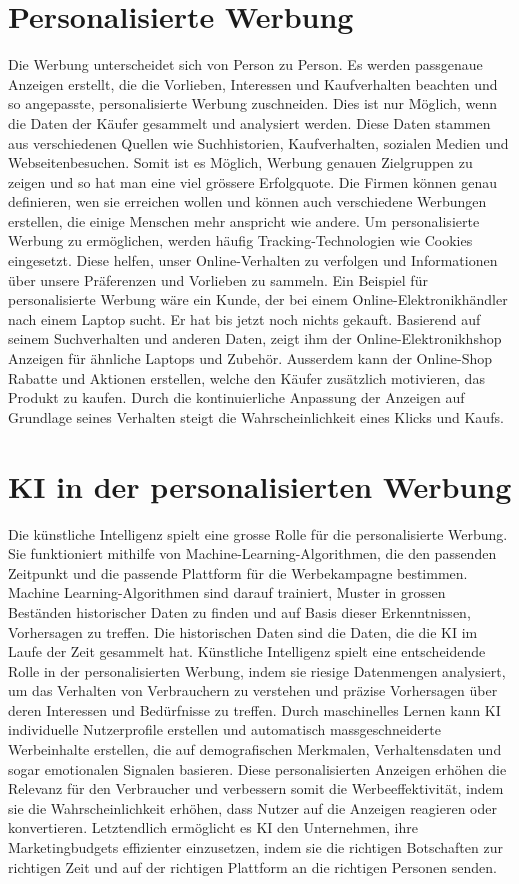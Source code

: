 \documentclass{article}
\begin{document}
\section{Personalisierte Werbung}
 Die Werbung unterscheidet sich von Person zu Person. Es werden passgenaue Anzeigen erstellt, die die Vorlieben, Interessen und Kaufverhalten beachten und so angepasste, personalisierte Werbung zuschneiden. Dies ist nur Möglich, wenn die Daten der Käufer gesammelt und analysiert werden. Diese Daten stammen aus verschiedenen Quellen wie Suchhistorien, Kaufverhalten, sozialen Medien und Webseitenbesuchen. Somit ist es Möglich, Werbung genauen Zielgruppen zu zeigen und so hat man eine viel grössere Erfolgquote. Die Firmen können genau definieren, wen sie erreichen wollen und können auch verschiedene Werbungen erstellen, die einige Menschen mehr anspricht wie andere. Um personalisierte Werbung zu ermöglichen, werden häufig Tracking-Technologien wie Cookies eingesetzt. Diese helfen, unser Online-Verhalten zu verfolgen und Informationen über unsere Präferenzen und Vorlieben zu sammeln. Ein Beispiel für personalisierte Werbung wäre ein Kunde, der bei einem Online-Elektronikhändler nach einem Laptop sucht. Er hat bis jetzt noch nichts gekauft. Basierend auf seinem Suchverhalten und anderen Daten, zeigt ihm der Online-Elektronikhshop Anzeigen für ähnliche Laptops und Zubehör. Ausserdem kann der Online-Shop Rabatte und Aktionen erstellen, welche den Käufer zusätzlich motivieren, das Produkt zu kaufen. Durch die kontinuierliche Anpassung der Anzeigen auf Grundlage seines Verhalten steigt die Wahrscheinlichkeit eines Klicks und Kaufs.

 \section{KI in der personalisierten Werbung}

 Die künstliche Intelligenz spielt eine grosse Rolle für die personalisierte Werbung. Sie funktioniert mithilfe von Machine-Learning-Algorithmen, die den passenden Zeitpunkt und die passende Plattform für die Werbekampagne bestimmen. Machine Learning-Algorithmen sind darauf trainiert, Muster in grossen Beständen historischer Daten zu finden und auf Basis dieser Erkenntnissen, Vorhersagen zu treffen. Die historischen Daten sind die Daten, die die KI im Laufe der Zeit gesammelt hat.
 Künstliche Intelligenz spielt eine entscheidende Rolle in der personalisierten Werbung, indem sie riesige Datenmengen analysiert, um das Verhalten von Verbrauchern zu verstehen und präzise Vorhersagen über deren Interessen und Bedürfnisse zu treffen. Durch maschinelles Lernen kann KI individuelle Nutzerprofile erstellen und automatisch massgeschneiderte Werbeinhalte erstellen, die auf demografischen Merkmalen, Verhaltensdaten und sogar emotionalen Signalen basieren. Diese personalisierten Anzeigen erhöhen die Relevanz für den Verbraucher und verbessern somit die Werbeeffektivität, indem sie die Wahrscheinlichkeit erhöhen, dass Nutzer auf die Anzeigen reagieren oder konvertieren. Letztendlich ermöglicht es KI den Unternehmen, ihre Marketingbudgets effizienter einzusetzen, indem sie die richtigen Botschaften zur richtigen Zeit und auf der richtigen Plattform an die richtigen Personen senden.
\end{document}
